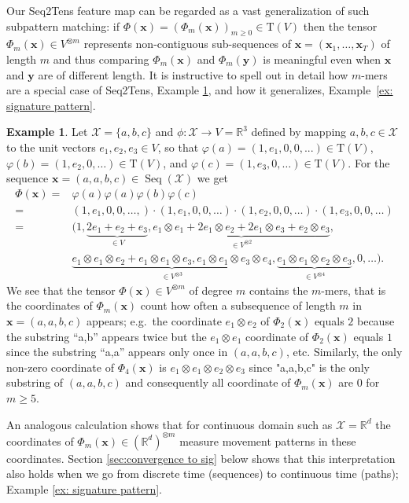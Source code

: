\documentclass{article} \usepackage{iclr2021_conference,times}
\newcommand{\R}{\mathbb{R}}
\newcommand{\bx}{\mathbf{x}}
\newcommand{\by}{\mathbf{y}}
\newcommand{\cX}{\mathcal{X}}
\newcommand{\T}[1]{\mathrm{T}({#1})}
\newcommand{\Seq}[1]{\operatorname{Seq}(#1)}
\theoremstyle{plain}
\theoremstyle{definition}
\newtheorem{example}[thm]{Example}
\begin{document}
Our Seq2Tens feature map can be regarded as a vast generalization of such subpattern matching: if $\Phi(\bx) = (\Phi_m(\bx))_{m \ge 0} \in \T{V}$ then the tensor $\Phi_m(\bx) \in V^{\otimes m}$ represents non-contiguous sub-sequences of $\bx=(\bx_1,\ldots,\bx_T)$ of length $m$ and thus comparing $\Phi_m(\bx)$ and $\Phi_m(\by)$ is meaningful even when $\bx$ and $\by$ are of different length. 
It is instructive to spell out in detail how $m$-mers are a special case of Seq2Tens, Example \ref{ex: strings}, and how it generalizes, Example~\ref{ex: signature pattern}.
\begin{example}\label{ex: strings}
 Let $\cX=\{a,b,c\}$ and $\phi:\cX \to V=\R^3$ defined by mapping $a,b,c \in \cX$ to the unit vectors $e_1,e_2,e_3 \in V$, so that $\varphi(a)=(1,e_1,0,0,...) \in \T{V}$, $\varphi(b)=(1,e_2,0,\ldots) \in \T{V}$, and $\varphi(c)=(1,e_3,0,\ldots) \in \T{V}$. 
For the sequence $\bx=(a,a,b,c) \in \Seq{\cX}$ we get 
  \begin{align}
    \Phi(\bx) =& \varphi(a)\varphi(a)\varphi(b)\varphi(c)\\
              =& (1,e_1,0,0,\ldots,) \cdot (1,e_1,0,0,\ldots) \cdot (1,e_2,0,0,\ldots)\cdot (1,e_3,0,0,\ldots)\\
              =& (1, \underbrace{2e_1 + e_2 + e_3}_{\in V},\underbrace{ e_1\otimes e_1 + 2 e_1 \otimes e_2+ 2e_1 \otimes e_3 + e_2 \otimes e_3}_{\in V^{\otimes 2}},\\
                & \underbrace{e_1\otimes e_1 \otimes e_2+e_1\otimes e_1 \otimes e_3, e_1 \otimes e_1 \otimes e_3 \otimes e_4}_{\in V^{\otimes 3}},\underbrace{e_1 \otimes e_1 \otimes e_2 \otimes e_3}_{\in V^{\otimes 4}},0 , \ldots ).
  \end{align}
We see that the tensor $\Phi(\bx) \in V^{\otimes m}$ of degree $m$ contains the
$m$-mers, that is the coordinates of $\Phi_m(\bx)$  count how often a subsequence of length $m$ in $\bx=(a,a,b,c)$ appears; e.g.~the coordinate $e_1 \otimes e_2$ of $\Phi_2(\bx)$ equals $2$ because the substring ``a,b'' appears twice but the $e_1\otimes e_1$ coordinate of $\Phi_2(\bx)$ equals $1$ since the substring ``a,a'' appears only once in $(a,a,b,c)$, etc.  
Similarly, the only non-zero coordinate of $\Phi_4(\bx)$ is $e_1 \otimes e_1 \otimes e_2 \otimes e_3$ since "a,a,b,c" is the only substring of $(a,a,b,c)$ and consequently all coordinate of $\Phi_m(\bx)$ are $0$ for $m \ge 5$. 
\end{example}
An analogous calculation shows that for continuous domain such as $\cX=\R^d$ the coordinates of $\Phi_m(\bx) \in (\R^d)^{\otimes m}$ measure movement patterns in these coordinates. 
Section \ref{sec:convergence to sig} below shows that this interpretation also holds when we go from discrete time (sequences) to continuous time (paths); Example \ref{ex: signature pattern}.
\end{document}
